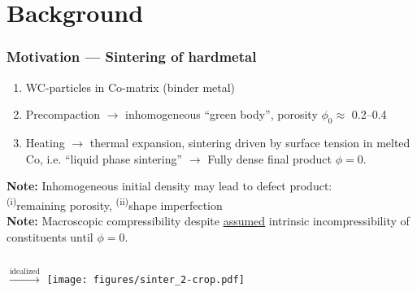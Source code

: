\documentclass[11pt]{beamer} %
\renewcommand{\alert}[1]{\textbf{#1}}
\begin{document}
\section{Background}
\begin{frame}
 \frametitle{Motivation --- Sintering of hardmetal}


 \begin{enumerate}
  \item WC-particles in Co-matrix (binder metal)
  \item Precompaction $\rightarrow$ inhomogeneous ``green body'', porosity $\phi_0\approx$ 0.2--0.4
  \item Heating $\rightarrow$ thermal expansion, sintering driven by surface tension in melted Co, i.e. ``liquid phase sintering'' $\rightarrow$
        Fully dense final product $\phi=0$.
 \end{enumerate}
\alert{Note:} Inhomogeneous initial density may lead to defect product:\\ \textsuperscript{(i)}remaining porosity, \textsuperscript{(ii)}shape imperfection\\
\alert{Note:} Macroscopic compressibility despite \underline{assumed} intrinsic incompressibility of constituents until $\phi = 0$.
\begin{center}
 \begin{columns}
 \centering
 \centering
 $\xrightarrow{\text{idealized}}$
 \centering
 \texttt{[image: figures/sinter\_2-crop.pdf]}
 \end{columns}
\end{center}
\end{frame}
\end{document}
